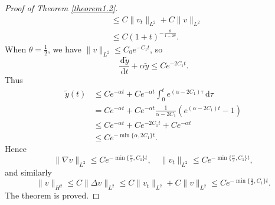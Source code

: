 \documentclass[10pt,a4paper]{amsart}
\begin{document}
\begin{proof}[Proof of Theorem \ref{theorem1.2}]
\begin{align*}
    &\le C\|v_t\|_{L^2}+C\|v\|_{L^2}\\
    &\le C(1+t)^{-\frac{\theta}{1-2\theta}}.
\end{align*}
When $\theta=\frac{1}{2}$, we have $\|v\|_{L^2}\le C_0 e^{-C_1 t}$, so
$$\frac{\,\mathrm{d}\widetilde{y}}{\,\mathrm{d}t}+\alpha\widetilde{y}\le Ce^{-2C_1 t}.$$
Thus
\begin{align*}
    \widetilde{y}(t)&\le Ce^{-\alpha t}+Ce^{-\alpha t}\int_{0}^{t}e^{(\alpha-2C_1)\tau}\,\mathrm{d}\tau\\
    &= Ce^{-\alpha t}+Ce^{-\alpha t}\frac{1}{\alpha-2C_1}\left(e^{(\alpha-2C_1)t}-1\right)\\
    &\le Ce^{-\alpha t}+Ce^{-2C_1 t}+Ce^{-\alpha t}\\
    &\le Ce^{-\min\{\alpha,2C_1\}t}.
\end{align*}
Hence
$$\|\nabla v\|_{L^2}\le Ce^{-\min\{\frac{\alpha}{2},C_1\}t},\quad \|v_t\|_{L^2}\le Ce^{-\min\{\frac{\alpha}{2},C_1\}t},$$
and similarly
$$\|v\|_{H^2}\le C\|\Delta v\|_{L^2}\le C\|v_t\|_{L^2}+C\|v\|_{L^2}\le Ce^{-\min\{\frac{\alpha}{2},C_1\}t}.$$
The theorem is proved.
\end{proof}
\end{document}

